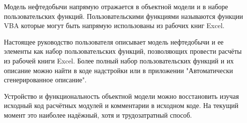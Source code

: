Модель нефтедобычи напрямую отражается в объектной модели \unf{} и в наборе пользовательских функций. Пользовательскими функциями называются функции VBA которые могут быть напрямую использованы из рабочих книг Excel. 

Настоящее руководство пользователя описывает модель нефтедобычи и ее элементы как набор пользовательских функций, позволяющих провести расчёты из рабочей книги Excel. Более полный набор пользовательских функций и их описание можно найти в коде надстройки или в приложении "Автоматически сгенерированное описание".

Устройство и функциональность объектной модели \unf{} можно восстановить изучая исходный код расчётных модулей и комментарии в исходном коде. На текущий момент это наиболее надёжный, хотя и трудозатратный способ.